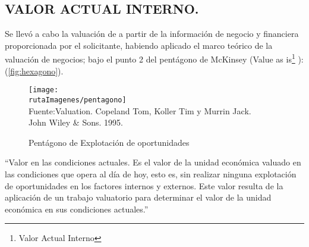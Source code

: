 \subsection{VALOR ACTUAL INTERNO.} 

Se llev\'o a cabo la valuaci\'on de \textcolor{principal}{\descripcionBien} a partir de la informaci\'on de negocio y financiera proporcionada por el solicitante, habiendo aplicado el marco te\'orico de la valuaci\'on de negocios; bajo el punto 2 del pentágono de McKinsey (Value as is\footnote{Valor Actual Interno} ): (\textcolor{terciario}{\autoref{fig:hexagono}}).

\begin{figure}[H]
\centering
\caption{Pent\'agono de Explotaci\'on de oportunidades\label{fig:hexagono}}
\texttt{[image: \\rutaImagenes/pentagono]}\\
Fuente:Valuation. Copeland Tom, Koller Tim y Murrin Jack.\\

John Wiley \& Sons. 1995.
\end{figure}

``\textcolor{secundario}{Valor en las condiciones actuales.} Es el valor de la unidad econ\'omica valuado en las condiciones que opera al d\'ia de hoy, esto es, sin realizar ninguna explotaci\'on de oportunidades en los factores internos y externos. Este valor resulta de la aplicaci\'on de un trabajo valuatorio para determinar el valor de la unidad econ\'omica en sus condiciones actuales.''